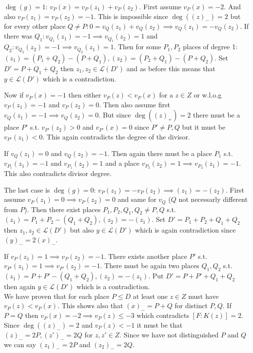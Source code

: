 \documentclass[12pt, a4paper]{article}
\begin{document}
$\deg(g)=1$: $v_P(x)=v_P(z_1)+v_P(z_2)$. First assume $v_P(x)=-2$. And also $v_P(z_1)=v_P(z_2)=-1$. This is impossible since $\deg((z)_{-})=2$ but for every other place $Q \neq P: 0 = v_Q(z_1)+v_Q(z_2) \implies v_Q(z_1)=-v_Q(z_2)$. If there was $Q_1: v_{Q_1}(z_1)=-1 \implies v_{Q_1}(z_2)=1$ and $Q_2: v_{Q_2}(z_2)=-1 \implies v_{Q_2}(z_1)=1$. Then for some $P_1,P_2$ places of degree 1: $(z_1)=(P_1+Q_2)-(P+Q_1), (z_2)=(P_2+Q_1)-(P+Q_2)$. Set $D'=P+Q_1+Q_2$ then $z_1,z_2 \in \mathcal{L}(D')$ and as before this means that $y \in \mathcal{L}(D')$ which is a contradiction.

Now if $v_P(x)=-1$ then either $v_P(z) < v_P(x)$ for a $z \in Z$ or w.l.o.g $v_P(z_1)=-1$ and $v_P(z_2)=0$. Then also assume first $v_Q(z_1)=-1 \implies v_Q(z_2)=0$. But since $\deg((z)_{+})=2$ there must be a place $P'$ s.t. $v_{P'}(z_2)>0$ and $v_{P'}(x)=0$ since $P'\neq P,Q$ but it must be $v_{P'}(z_1) < 0$. This again contradicts the degree of the divisor. 

If $v_Q(z_1)=0$ and $v_Q(z_2)=-1$. Then again there must be a place $P_1$ s.t. $v_{P_1}(z_1)=-1$ and $v_{P_1}(z_2)=1$ and a place $v_{P_2}(z_2)=1 \implies v_{P_2}(z_1)=-1$. This also contradicts divisor degree.

The last case is $\deg(g)=0$: $v_P(z_1)=-v_P(z_2) \implies (z_1) = -(z_2)$. First assume $v_P(z_1)=0 \implies v_P(z_2)=0$ and same for $v_Q$ ($Q$ not necessarly different from $P$). Then there exist places $P_1,P_2,Q_1,Q_2 \neq P,Q$ s.t. $(z_1)=P_1+P_2-(Q_1+Q_2), (z_2)=-(z_1)$. Set $D' = P_1+P_2+Q_1+Q_2$ then $z_1,z_2 \in \mathcal{L}(D')$ but also $y \in \mathcal{L}(D')$ which is again contradiction since $(y)_{-}=2(x)_{-}$.

If $v_P(z_1)=1 \implies v_P(z_2)=-1$. There exists another place $P'$ s.t. $v_{P'}(z_1)=1 \implies v_{P'}(z_2)=-1$. There must be again two places $Q_1,Q_2$ s.t. $(z_1)=P+P'-(Q_1+Q_2), (z_2) = -(z_1)$. Put $D' = P+P'+Q_1+Q_2$ then again $y \in \mathcal{L}(D')$ which is a contradiction.
\\

We have proven that for each place $P \leq D$ at least one $z \in Z$ must have $v_P(z)<v_P(x)$. This shows also that $(x)_{-}=P+Q$ for distinct $P,Q$. If $P=Q$ then $v_P(x)=-2 \implies v_P(z)\leq -3$ which contradicts $[F:K(z)]=2$. Since $\deg((z)_{-})=2$ and $v_P(z) < -1$ it must be that $(z)_{-}=2P, (z')_{-}=2Q$ for $z,z' \in Z$. Since we have not distinguished $P$ and $Q$ we can say $(z_1)_{-}=2P$ and $(z_2)_{-}=2Q$.
\end{document}
